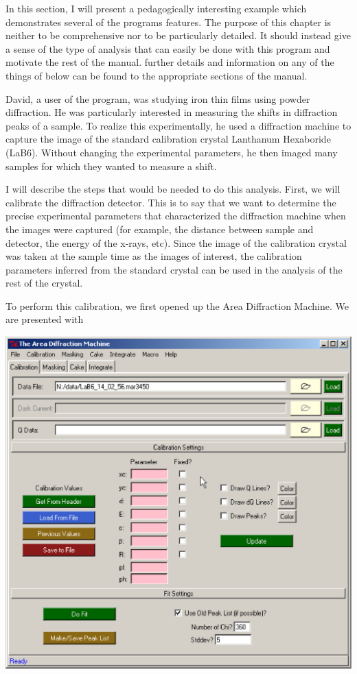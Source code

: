 In this section, I will present a pedagogically interesting 
example which demonstrates several of the programs features. 
The purpose of this chapter is neither to be comprehensive
nor to be particularly detailed. It should instead give a 
sense of the type of analysis that can easily be done with 
this program and motivate the rest of the manual. 
further details and information on any of 
the things of below can be found to the appropriate sections 
of the manual.

David, a user of the program, was studying iron thin films 
using powder diffraction. He was particularly interested in 
measuring the shifts in diffraction peaks of a sample. To 
realize this experimentally, he used a diffraction machine 
to capture the image of the standard calibration crystal 
Lanthanum Hexaboride (LaB6). Without changing the experimental 
parameters, he then imaged many samples for which they wanted 
to measure a shift.

I will describe the steps that would be needed to do this
analysis. First, we will calibrate the diffraction detector.
This is to say that we want to determine the precise 
experimental parameters that characterized the diffraction
machine when the images were captured (for example, the distance
between sample and detector, the energy of the x-rays, etc). Since 
the image of the calibration crystal was taken at the sample
time as the images of interest, the calibration parameters inferred
from the standard crystal can be used in the analysis of the
rest of the crystal.

To perform this calibration, we first opened up the Area 
Diffraction Machine. We are presented with

\includegraphics[scale=.75]{figures/calibration_page.eps}

